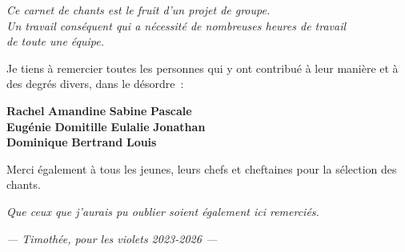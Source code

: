 \begin{center}
\begin{minipage}{0.86\textwidth}
\setlength{\parskip}{0.4em}
\footnotesize

\begin{center}\itshape\color{tassindarkbrown}
Ce carnet de chants est le fruit d'un projet de groupe.\\
Un travail conséquent qui a nécessité de nombreuses heures de travail\\ de toute une équipe.
\end{center}

Je tiens à remercier toutes les personnes qui y ont contribué à leur manière et à des degrés divers, dans le désordre~:

\vspace{0.1em}

\begin{center}
  \textbf{\color{tassingreen}Rachel} \textperiodcentered{} \textbf{\color{tassinred}Amandine} \textperiodcentered{} \textbf{\color{tassingreen}Sabine} \textperiodcentered{} \textbf{\color{tassinred}Pascale}\\
  \textbf{\color{tassingreen}Eugénie} \textperiodcentered{} \textbf{\color{tassinred}Domitille} \textperiodcentered{} \textbf{\color{tassingreen}Eulalie} \textperiodcentered{}\textbf{\color{tassinred}Jonathan}\\
  \textbf{\color{tassingreen}Dominique} \textperiodcentered{} \textbf{\color{tassinred}Bertrand} \textperiodcentered{} \textbf{\color{tassingreen}Louis}
\end{center}

\vspace{0.1em}

Merci également à tous les jeunes, leurs chefs et cheftaines pour la sélection des chants.

{\scriptsize\itshape Que ceux que j'aurais pu oublier soient également ici remerciés.}
\end{minipage}
\end{center}

\vspace{0.6em}

\begin{center}
\end{center}

\vspace{0.4em}

\begin{flushright}
  {\footnotesize\itshape\color{tassindarkbrown}— Timothée, pour les violets 2023-2026 —}
\end{flushright}

\endgroup
\clearpage
